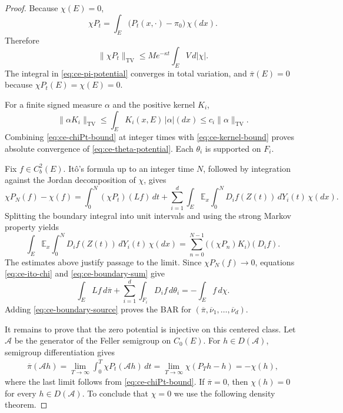 \documentclass[aihp]{imsart}
\numberwithin{equation}{section}
\theoremstyle{plain}
\theoremstyle{definition}
\newcommand{\TV}{\mathrm{TV}}
\newcommand{\1}{\mathbf 1}
\begin{document}
\begin{proof}
Because $\chi(E)=0$,
\[
 \chi P_t=\int_E\bigl(P_t(x,\cdot)-\pi_0\bigr)\,\chi(dx).
\]
Therefore
\begin{equation}\label{eq:ce-chiPt-bound}
 \|\chi P_t\|_{\TV}
 \le M e^{-\kappa t}\int_E V\,d|\chi|.
\end{equation}
The integral in \eqref{eq:ce-pi-potential} converges in total variation, and $\overline\pi(E)=0$ because $\chi P_t(E)=\chi(E)=0$.

For a finite signed measure $\alpha$ and the positive kernel $K_i$,
\begin{equation}\label{eq:ce-kernel-bound}
 \|\alpha K_i\|_{\TV}
 \le\int_EK_i(x,E)\,|\alpha|(dx)
 \le c_i\|\alpha\|_{\TV}.
\end{equation}
Combining \eqref{eq:ce-chiPt-bound} at integer times with \eqref{eq:ce-kernel-bound} proves absolute convergence of \eqref{eq:ce-theta-potential}. Each $\theta_i$ is supported on $F_i$.

Fix $f\in C_b^2(E)$. It\^o's formula up to an integer time $N$, followed by integration against the Jordan decomposition of $\chi$, gives
\begin{equation}\label{eq:ce-ito-chi}
 \chi P_N(f)-\chi(f)
 =\int_0^N(\chi P_t)(Lf)\,dt
  +\sum_{i=1}^d\int_E\mathbb E_x\int_0^N D_i f(Z(t))\,dY_i(t)\,\chi(dx).
\end{equation}
Splitting the boundary integral into unit intervals and using the strong Markov property yields
\begin{equation}\label{eq:ce-boundary-sum}
 \int_E\mathbb E_x\int_0^N D_i f(Z(t))\,dY_i(t)\,\chi(dx)
 =\sum_{n=0}^{N-1}\bigl((\chi P_n)K_i\bigr)(D_i f).
\end{equation}
The estimates above justify passage to the limit. Since $\chi P_N(f)\to0$, equations \eqref{eq:ce-ito-chi} and \eqref{eq:ce-boundary-sum} give
\[
 \int_E Lf\,d\overline\pi
 +\sum_{i=1}^d\int_{F_i}D_i f\,d\theta_i
 =-\int_E f\,d\chi.
\]
Adding \eqref{eq:ce-boundary-source} proves the BAR for $(\overline\pi,\overline\nu_1,\ldots,\overline\nu_d)$.

It remains to prove that the zero potential is injective on this centered class. Let $\mathcal A$ be the generator of the Feller semigroup on $C_0(E)$. For $h\in D(\mathcal A)$, semigroup differentiation gives
\begin{align*}
 \overline\pi(\mathcal A h)
 =\lim_{T\to\infty}\int_0^T\chi P_t(\mathcal A h)\,dt=\lim_{T\to\infty}\chi(P_T h-h)=-\chi(h),
\end{align*}
where the last limit follows from \eqref{eq:ce-chiPt-bound}. If $\overline\pi=0$, then $\chi(h)=0$ for every $h\in D(\mathcal A)$. To conclude that $\chi=0$ we use the following density theorem.


\end{proof}
\end{document}
